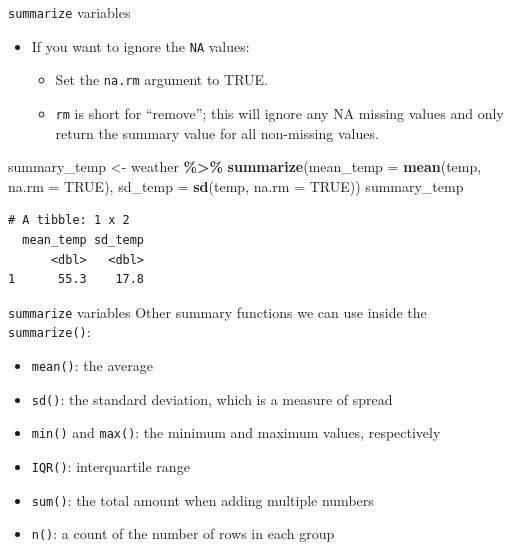 \documentclass[
  ignorenonframetext,
]{beamer}
\newenvironment{Shaded}{\begin{snugshade}}{\end{snugshade}}
\newcommand{\AttributeTok}[1]{\textcolor[rgb]{0.13,0.29,0.53}{#1}}
\newcommand{\ConstantTok}[1]{\textcolor[rgb]{0.56,0.35,0.01}{#1}}
\newcommand{\FunctionTok}[1]{\textcolor[rgb]{0.13,0.29,0.53}{\textbf{#1}}}
\newcommand{\NormalTok}[1]{#1}
\newcommand{\OtherTok}[1]{\textcolor[rgb]{0.56,0.35,0.01}{#1}}
\newcommand{\SpecialCharTok}[1]{\textcolor[rgb]{0.81,0.36,0.00}{\textbf{#1}}}
\providecommand{\tightlist}{%
  \setlength{\itemsep}{0pt}\setlength{\parskip}{0pt}}
\begin{document}
\begin{frame}[fragile]{\texttt{summarize} variables}
\protect\hypertarget{summarize-variables-2}{}
\begin{itemize}
\item
  If you want to ignore the \texttt{NA} values:

  \begin{itemize}
  \tightlist
  \item
    Set the \texttt{na.rm} argument to TRUE.
  \item
    \texttt{rm} is short for ``remove''; this will ignore any NA missing
    values and only return the summary value for all non-missing values.
  \end{itemize}
\end{itemize}

\normalsize

\begin{Shaded}
\begin{Highlighting}[]
\NormalTok{summary\_temp }\OtherTok{\textless{}{-}}\NormalTok{ weather }\SpecialCharTok{\%\textgreater{}\%} 
  \FunctionTok{summarize}\NormalTok{(}\AttributeTok{mean\_temp =} \FunctionTok{mean}\NormalTok{(temp, }\AttributeTok{na.rm =} \ConstantTok{TRUE}\NormalTok{), }
            \AttributeTok{sd\_temp =} \FunctionTok{sd}\NormalTok{(temp, }\AttributeTok{na.rm =} \ConstantTok{TRUE}\NormalTok{))}
\NormalTok{summary\_temp}
\end{Highlighting}
\end{Shaded}

\begin{verbatim}
# A tibble: 1 x 2
  mean_temp sd_temp
      <dbl>   <dbl>
1      55.3    17.8
\end{verbatim}

\normalsize
\end{frame}

\begin{frame}[fragile]{\texttt{summarize} variables}
\protect\hypertarget{summarize-variables-3}{}
Other summary functions we can use inside the \texttt{summarize()}:

\begin{itemize}
\tightlist
\item
  \texttt{mean()}: the average
\item
  \texttt{sd()}: the standard deviation, which is a measure of spread
\item
  \texttt{min()} and \texttt{max()}: the minimum and maximum values,
  respectively
\item
  \texttt{IQR()}: interquartile range
\item
  \texttt{sum()}: the total amount when adding multiple numbers
\item
  \texttt{n()}: a count of the number of rows in each group
\end{itemize}
\end{frame}
\end{document}
